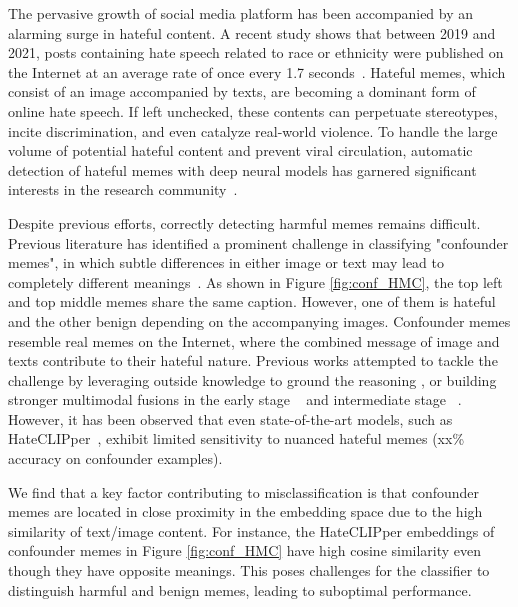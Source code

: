 \documentclass[11pt]{article}
\begin{document}
The pervasive growth of social media platform has been accompanied by an alarming surge in hateful content. A recent study shows that between 2019 and 2021, posts containing hate speech related to race or ethnicity were published on the Internet at an average rate of once every 1.7 seconds~\cite{ditch_the_label_2021}. Hateful memes, which consist of an image accompanied by texts, are becoming a dominant form of online hate speech. If left unchecked, these contents can perpetuate stereotypes, incite discrimination, and even catalyze real-world violence. To handle the large volume of potential hateful content and prevent viral circulation, automatic detection of hateful memes with deep neural models has garnered significant interests in the research community~\cite{KielaFBHMC2020, TamilTroll2020, suryawanshi-etal-2020-MultiOFF, pramanickCovidMeme2021, LiuFigMemes2022, HossainMUTEMeme2022, PrakashTotalDefMeme2023, SahinARCHateSpeechEvent2023}.



Despite previous efforts, correctly detecting harmful memes remains difficult. Previous literature has identified a prominent challenge in classifying "confounder memes", in which subtle differences in either image or text may lead to completely different meanings~\citep{KielaFBHMC2020}.  As shown in Figure \ref{fig:conf_HMC}, the top left and top middle memes share the same caption. However, one of them is hateful and the other benign depending on the accompanying images. Confounder memes resemble real memes on the Internet, where the combined message of image and texts contribute to their hateful nature. Previous works attempted to tackle the challenge by leveraging outside knowledge to ground the reasoning \cite{RonHMC1st2020}, or building stronger multimodal fusions in the early stage ~\cite{PramanickMomenta2021} and intermediate stage ~\cite{KumarHateClip2022}.
However, it has been observed that even state-of-the-art models, such as HateCLIPper~\cite{KumarHateClip2022}, exhibit limited sensitivity to nuanced hateful memes (xx\% accuracy on confounder examples). 

We find that a key factor contributing to misclassification is that confounder memes are located in close proximity in the embedding space due to the high similarity of text/image content.  For instance,  the HateCLIPper embeddings of confounder memes in Figure \ref{fig:conf_HMC} have high cosine similarity  even though they have opposite meanings. This poses challenges for the classifier to distinguish harmful and benign memes, leading to suboptimal performance.
\end{document}
